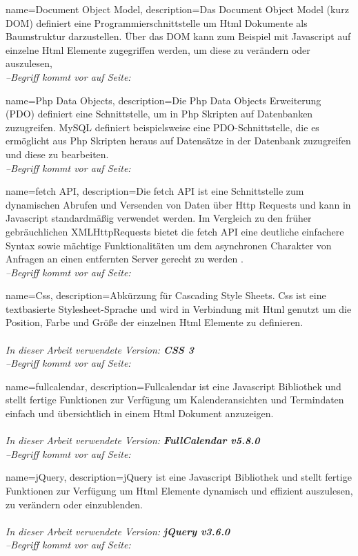 {
    name=Document Object Model,
    description={Das Document Object Model (kurz DOM) definiert eine Programmierschnittstelle um \gls{Html} Dokumente als Baumstruktur darzustellen. Über das DOM kann zum Beispiel mit \gls{Javascript} auf einzelne Html Elemente zugegriffen werden, um diese zu verändern oder auszulesen,}
    \\\textit{--Begriff kommt vor auf Seite: }
}

{
    name=Php Data Objects,
    description={Die Php Data Objects Erweiterung (PDO) definiert eine Schnittstelle, um in \gls{Php} Skripten auf Datenbanken zuzugreifen. \gls{MySQL} definiert beispielsweise eine PDO-Schnittstelle, die es ermöglicht aus Php Skripten heraus auf Datensätze in der Datenbank zuzugreifen und diese zu bearbeiten.}
    \\\textit{--Begriff kommt vor auf Seite: }
}

{
    name=fetch API,
    description={Die fetch API ist eine Schnittstelle zum dynamischen Abrufen und Versenden von Daten über \gls{Http} Requests und kann in \gls{Javascript} standardmäßig verwendet werden. Im Vergleich zu den früher gebräuchlichen XMLHttpRequests bietet die fetch API eine deutliche einfachere Syntax sowie mächtige Funktionalitäten um dem asynchronen Charakter von Anfragen an einen entfernten Server gerecht zu werden
            \cite{fetchAPI}.}
    \\\textit{--Begriff kommt vor auf Seite: }
}

{
    name=Css,
    description={Abkürzung für Cascading Style Sheets. Css ist eine textbasierte Stylesheet-Sprache und wird in Verbindung mit \gls{Html} genutzt um die Position, Farbe und Größe der einzelnen Html Elemente zu definieren.\\ \\
            \textit{In dieser Arbeit verwendete Version: \textbf{CSS 3}}
            \cite{Css}}
    \\\textit{--Begriff kommt vor auf Seite: }
}

{
    name=fullcalendar,
    description={Fullcalendar ist eine \gls{Javascript} Bibliothek und stellt fertige Funktionen zur Verfügung um Kalenderansichten und Termindaten einfach und übersichtlich in einem \gls{Html} Dokument anzuzeigen.\\ \\
            \textit{In dieser Arbeit verwendete Version: \textbf{FullCalendar v5.8.0}}
            \cite{fullCalendarWeb}}
    \\\textit{--Begriff kommt vor auf Seite: }
}

{
    name=jQuery,
    description={jQuery ist eine \gls{Javascript} Bibliothek und stellt fertige Funktionen zur Verfügung um \gls{Html} Elemente dynamisch und effizient auszulesen, zu verändern oder einzublenden.\\ \\
            \textit{In dieser Arbeit verwendete Version: \textbf{jQuery v3.6.0}}
            \cite{jQuery}}
    \\\textit{--Begriff kommt vor auf Seite: }
}